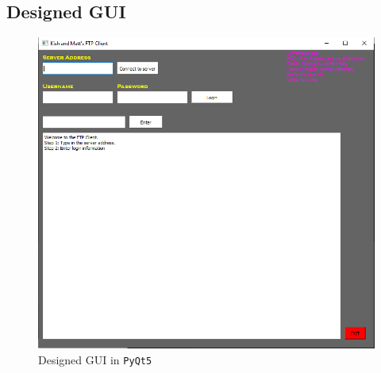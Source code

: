 \documentclass[10pt,twocolumn]{witseiepaper}
\def\code#1{\texttt{#1}}
\begin{document}
\onecolumn
\begin{appendices}

\section{Designed GUI}
\label{app: GUI}
\begin{figure}[h!]
\renewcommand{\thefigure}{\arabic{figure}}
\centering
\includegraphics[scale=0.8]{GUI.png}
\caption{Designed GUI in \code{PyQt5}}
\label{fig: GUI}
\end{figure}


\pagebreak

\end{appendices}
\end{document}
